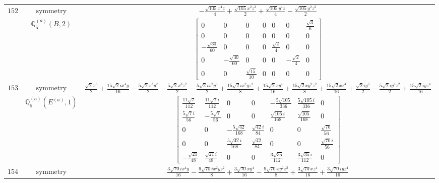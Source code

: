 \documentclass[fleqn,8pt,landscape]{jsarticle}
\begin{document}
\begin{longtable}{ccc}
$ 152 $ & $ \text{symmetry} $ & $ - \frac{\sqrt{105} x^{4} z}{4} + \frac{\sqrt{105} x^{2} z^{3}}{2} + \frac{\sqrt{105} y^{4} z}{4} - \frac{\sqrt{105} y^{2} z^{3}}{2} $ \\
$  $ & $ \mathbb{Q}_{5}^{(a)}(B,2) $ & $ \begin{bmatrix} 0 & 0 & 0 & 0 & 0 & 0 & \frac{\sqrt{3}}{6} \\ 0 & 0 & 0 & 0 & 0 & 0 & 0 \\ - \frac{\sqrt{30}}{60} & 0 & 0 & 0 & \frac{\sqrt{2}}{4} & 0 & 0 \\ 0 & - \frac{\sqrt{30}}{60} & 0 & 0 & 0 & - \frac{\sqrt{2}}{4} & 0 \\ 0 & 0 & \frac{\sqrt{15}}{10} & 0 & 0 & 0 & 0 \end{bmatrix} $ \\ \hline
$ 153 $ & $ \text{symmetry} $ & $ \frac{\sqrt{2} x^{5}}{2} + \frac{15 \sqrt{2} i x^{4} y}{16} - \frac{5 \sqrt{2} x^{3} y^{2}}{2} - \frac{5 \sqrt{2} x^{3} z^{2}}{2} - \frac{5 \sqrt{2} i x^{2} y^{3}}{2} + \frac{15 \sqrt{2} i x^{2} y z^{2}}{8} + \frac{15 \sqrt{2} x y^{4}}{16} + \frac{15 \sqrt{2} x y^{2} z^{2}}{8} + \frac{15 \sqrt{2} x z^{4}}{16} + \frac{\sqrt{2} i y^{5}}{2} - \frac{5 \sqrt{2} i y^{3} z^{2}}{2} + \frac{15 \sqrt{2} i y z^{4}}{16} $ \\
$  $ & $ \mathbb{Q}_{5}^{(a)}(E^{(a)},1) $ & $ \begin{bmatrix} \frac{11 \sqrt{7}}{112} & \frac{11 \sqrt{7} i}{112} & 0 & 0 & - \frac{5 \sqrt{105}}{336} & \frac{5 \sqrt{105} i}{336} & 0 \\ \frac{5 \sqrt{7} i}{56} & - \frac{5 \sqrt{7}}{56} & 0 & 0 & \frac{\sqrt{105} i}{168} & \frac{\sqrt{105}}{168} & 0 \\ 0 & 0 & - \frac{5 \sqrt{42}}{168} & \frac{\sqrt{42} i}{84} & 0 & 0 & \frac{\sqrt{70}}{56} \\ 0 & 0 & \frac{5 \sqrt{42} i}{168} & \frac{\sqrt{42}}{84} & 0 & 0 & \frac{\sqrt{70} i}{56} \\ - \frac{\sqrt{21}}{48} & \frac{\sqrt{21} i}{48} & 0 & 0 & \frac{3 \sqrt{35}}{112} & \frac{3 \sqrt{35} i}{112} & 0 \end{bmatrix} $ \\ \hline
$ 154 $ & $ \text{symmetry} $ & $ \frac{3 \sqrt{70} i x^{4} y}{16} - \frac{9 \sqrt{70} i x^{2} y z^{2}}{8} + \frac{3 \sqrt{70} x y^{4}}{16} - \frac{9 \sqrt{70} x y^{2} z^{2}}{8} + \frac{3 \sqrt{70} x z^{4}}{16} + \frac{3 \sqrt{70} i y z^{4}}{16} $ \\

\end{longtable}
\end{document}

